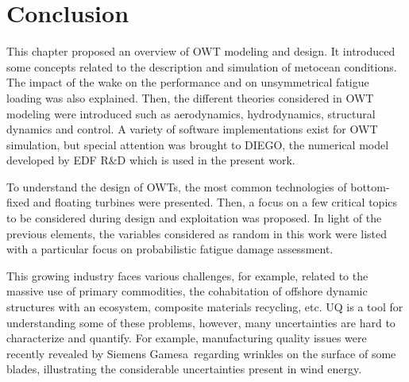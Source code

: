 \section{Conclusion}

This chapter proposed an overview of OWT modeling and design. 
It introduced some concepts related to the description and simulation of metocean conditions. 
The impact of the wake on the performance and on unsymmetrical fatigue loading was also explained.  
Then, the different theories considered in OWT modeling were introduced such as aerodynamics, hydrodynamics, structural dynamics and control. 
A variety of software implementations exist for OWT simulation, but special attention was brought to DIEGO, the numerical model developed by EDF R\&D which is used in the present work. 

To understand the design of OWTs, the most common technologies of bottom-fixed and floating turbines were presented. 
Then, a focus on a few critical topics to be considered during design and exploitation was proposed. 
In light of the previous elements, the variables considered as random in this work were listed with a particular focus on probabilistic fatigue damage assessment.   

This growing industry faces various challenges, for example, related to the massive use of primary commodities, the cohabitation of offshore dynamic structures with an ecosystem, composite materials recycling, etc. 
UQ is a tool for understanding some of these problems, however, many uncertainties are hard to characterize and quantify. 
For example, manufacturing quality issues were recently revealed by Siemens Gamesa\footnotemark~regarding wrinkles on the surface of some blades, illustrating the considerable uncertainties present in wind energy. 



